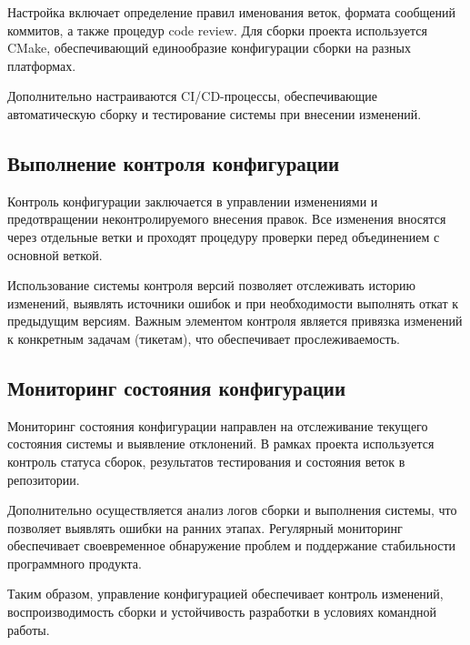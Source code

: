 \documentclass[14pt,a4paper]{extarticle}
\begin{document}
Настройка включает определение правил именования веток, формата сообщений коммитов, а также процедур code review. Для сборки проекта используется CMake, обеспечивающий единообразие конфигурации сборки на разных платформах.

Дополнительно настраиваются CI/CD-процессы, обеспечивающие автоматическую сборку и тестирование системы при внесении изменений.

\subsection{Выполнение контроля конфигурации}

Контроль конфигурации заключается в управлении изменениями и предотвращении неконтролируемого внесения правок. Все изменения вносятся через отдельные ветки и проходят процедуру проверки перед объединением с основной веткой.

Использование системы контроля версий позволяет отслеживать историю изменений, выявлять источники ошибок и при необходимости выполнять откат к предыдущим версиям. Важным элементом контроля является привязка изменений к конкретным задачам (тикетам), что обеспечивает прослеживаемость.

\subsection{Мониторинг состояния конфигурации}

Мониторинг состояния конфигурации направлен на отслеживание текущего состояния системы и выявление отклонений. В рамках проекта используется контроль статуса сборок, результатов тестирования и состояния веток в репозитории.

Дополнительно осуществляется анализ логов сборки и выполнения системы, что позволяет выявлять ошибки на ранних этапах. Регулярный мониторинг обеспечивает своевременное обнаружение проблем и поддержание стабильности программного продукта.

Таким образом, управление конфигурацией обеспечивает контроль изменений, воспроизводимость сборки и устойчивость разработки в условиях командной работы.
\end{document}
